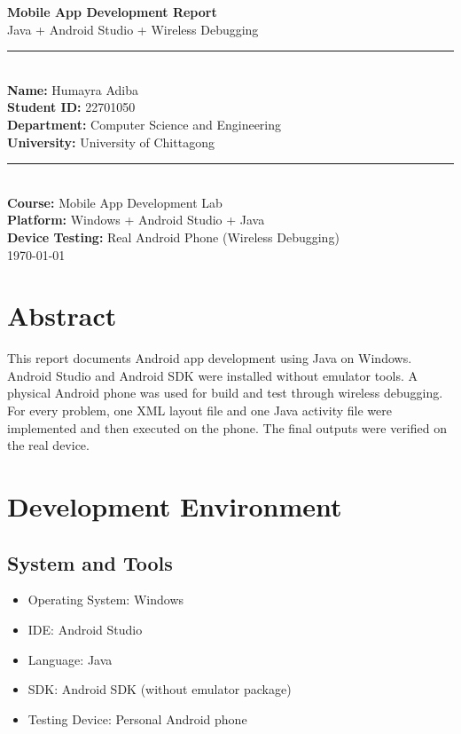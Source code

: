 \documentclass[12pt]{article}
\begin{document}
\begin{titlepage}
\begin{center}
    \vspace*{1cm}
    {\Huge \textbf{Mobile App Development Report}}\\[0.4cm]
    {\Large Java + Android Studio + Wireless Debugging}\\[1.0cm]

    \rule{0.9\textwidth}{0.8pt}\\[0.6cm]
    \textbf{Name:} Humayra Adiba\\
    \textbf{Student ID:} 22701050\\
    \textbf{Department:} Computer Science and Engineering\\
    \textbf{University:} University of Chittagong\\[0.6cm]
    \rule{0.9\textwidth}{0.8pt}\\[1.2cm]

    \textbf{Course:} Mobile App Development Lab\\
    \textbf{Platform:} Windows + Android Studio + Java\\
    \textbf{Device Testing:} Real Android Phone (Wireless Debugging)\\[1.5cm]

    \today
\end{center}
\end{titlepage}

\tableofcontents
\newpage

\section*{Abstract}
This report documents Android app development using Java on Windows. Android Studio and Android SDK were installed without emulator tools. A physical Android phone was used for build and test through wireless debugging. For every problem, one XML layout file and one Java activity file were implemented and then executed on the phone. The final outputs were verified on the real device.

\section{Development Environment}
\subsection{System and Tools}
\begin{itemize}[leftmargin=*]
    \item Operating System: Windows
    \item IDE: Android Studio
    \item Language: Java
    \item SDK: Android SDK (without emulator package)
    \item Testing Device: Personal Android phone
\end{itemize}
\end{document}
